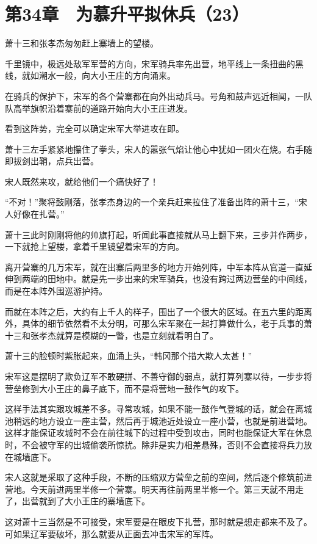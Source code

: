 \section{第34章　为慕升平拟休兵（23）}

萧十三和张孝杰匆匆赶上寨墙上的望楼。

千里镜中，极远处敌军军营的方向，宋军骑兵率先出营，地平线上一条扭曲的黑线，就如潮水一般，向大小王庄的方向涌来。

在骑兵的保护下，宋军的各个营寨都在向外出动兵马。号角和鼓声远近相闻，一队队高举旗帜沿着寨前的道路开始向大小王庄进发。

看到这阵势，完全可以确定宋军大举进攻在即。

萧十三左手紧紧地攥住了拳头，宋人的嚣张气焰让他心中犹如一团火在烧。右手随即拔剑出鞘，点兵出营。

宋人既然来攻，就给他们一个痛快好了！

“不对！”聚将鼓刚落，张孝杰身边的一个亲兵赶来拉住了准备出阵的萧十三，“宋人好像在扎营。”

萧十三此时刚刚将他的帅旗打起，听闻此事直接就从马上翻下来，三步并作两步，一下就抢上望楼，拿着千里镜望着宋军的方向。

离开营寨的几万宋军，就在出寨后两里多的地方开始列阵，中军本阵从官道一直延伸到两端的田地中。就是先一步出来的宋军骑兵，也没有跨过两边营垒的中间线，而是在本阵外围巡游护持。

而就在本阵之后，大约有上千人的样子，围出了一个很大的区域。在五六里的距离外，具体的细节依然看不太分明，可那么宋军聚在一起打算做什么，老于兵事的萧十三和张孝杰就算是模糊的一瞥，也是立刻就看明白了。

萧十三的脸顿时紫胀起来，血涌上头，“韩冈那个措大欺人太甚！”

宋军这是摆明了欺负辽军不敢硬拼、不善守御的弱点，就打算列寨以待，一步步将营垒修到大小王庄的鼻子底下，而不是将营地一鼓作气的攻下。

这样手法其实跟攻城差不多。寻常攻城，如果不能一鼓作气登城的话，就会在离城池稍远的地方设立一座主营，然后再于城池近处设立一座小营，也就是前进营地。这样才能保证攻城时不会在前往城下的过程中受到攻击，同时也能保证大军在休息时，不会被守军的出城偷袭所惊扰。除非是实力相差悬殊，否则不会直接将兵力放在城墙底下。

宋人这就是采取了这种手段，不断的压缩双方营垒之前的空间，然后逐个修筑前进营地。今天前进两里半修一个营寨。明天再往前两里半修一个。第三天就不用走了，出营就到了大小王庄的寨墙底下。

这对萧十三当然是不可接受，宋军要是在眼皮下扎营，那时就是想走都来不及了。可如果辽军要破坏，那么就要从正面去冲击宋军的军阵。


